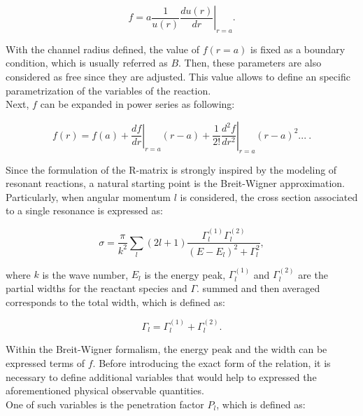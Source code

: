 \documentclass[openany]{book}
\begin{document}
\begin{equation}\label{eq:rmatrix_f}
	f = a\left.\frac{1}{u(r)} \frac{du(r)}{dr}\right|_{r = a}.
\end{equation}

With the channel radius defined, the value of $f(r = a)$ is fixed as a boundary condition, which is usually referred as $B$.  Then, these parameters are also considered as free since they are adjusted. This value allows to define an specific parametrization of the variables of the reaction. \\

Next, $f$ can be expanded in power series as following: 

\begin{equation}   \label{eq:rmatrix_f_powerSeries}
	f(r) = f(a) + \left.\frac{df}{dr}\right|_{r = a} (r - a) +  \frac{1}{2!} \left.\frac{d^2f}{dr^2}\right|_{r = a} (r - a )^2  ... \ .
\end{equation}


Since the formulation of the R-matrix is strongly inspired by the modeling of resonant reactions, a natural starting point is the Breit-Wigner approximation. Particularly, when angular momentum $l$ is considered, the cross section associated to a single resonance is expressed as:

\begin{equation}  \label{eq:rmatrix_breitWigner}
	\sigma = \frac{\pi}{k^2} \sum_{l} (2l + 1) \frac{\Gamma^{(1)}_{l} \Gamma^{(2)}_{l} }{(E - E_l)^2  + \Gamma^2_l }, 
\end{equation}

where $k$ is the wave number, $E_l$ is the energy peak,  $\Gamma^{(1)}_{l}$ and $\Gamma^{(2)}_{l}$ are the partial widths for the reactant species and $\Gamma$. summed and then averaged corresponds to the total width, which is defined as: 

\begin{equation}  \label{eq:rmatrix_totalWidth}
	\Gamma_l = \Gamma^{(1)}_{l} + \Gamma^{(2)}_{l}. 
\end{equation}


Within the Breit-Wigner formalism, the energy peak and the width can be expressed terms of $f$. Before introducing the exact form of the relation, it is necessary to define additional variables that would help to expressed the aforementioned physical observable quantities.  \\

One of such variables is the penetration factor $P_l$, which is defined as: 
\end{document}
